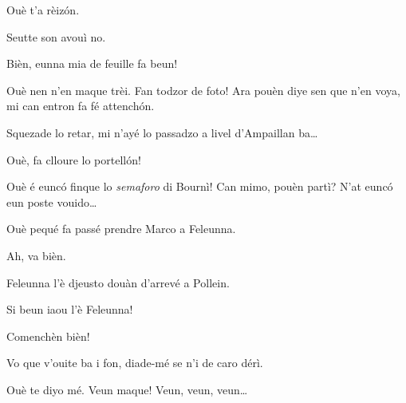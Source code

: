 \begin{drama}
\Joelspeaks Ouè t'a rèiz\'on.


\Joelspeaks{} Seutte son avouì no.

\Chauffeurspeaks Bièn, eunna mia de feuille fa beun!

\Joelspeaks Ouè nen n'en maque trèi. Fan todzor de foto! Ara pouèn diye sen que n'en voya, mi can entron fa fé attench\'on.


\Stephaniespeaks Squezade lo retar, mi n'ayé lo passadzo a livel d’Ampaillan ba\ldots

\Simonespeaks Ouè, fa clloure lo portell\'on!


\Chauffeurspeaks{} Ouè é euncó finque lo \textit{semaforo} di Bournì! Can mimo, pouèn partì? N'at euncó eun poste vouido\ldots

\Simonespeaks Ouè pequé fa passé prendre Marco a Feleunna.

\Chauffeurspeaks Ah, va bièn.

\Joelspeaks{} Feleunna l'è djeusto douàn d'arrevé a Pollein.

\Chauffeurspeaks Si beun iaou l'è Feleunna!



\Joelspeaks{} Comenchèn bièn!





\Chauffeurspeaks Vo que v'ouite ba i fon, diade-mé se n'i de caro dérì.

\Jordyspeaks Ouè te diyo mé. Veun maque! Veun, veun, veun\ldots


\end{drama}
